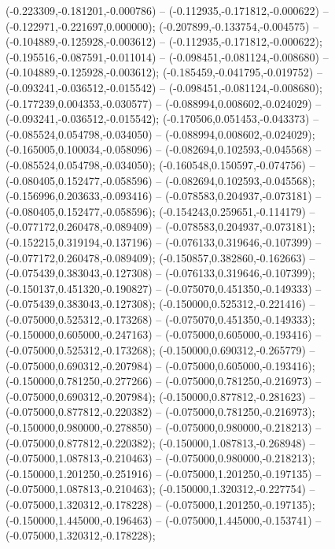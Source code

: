  (-0.223309,-0.181201,-0.000786) -- (-0.112935,-0.171812,-0.000622) -- (-0.122971,-0.221697,0.000000);
 (-0.207899,-0.133754,-0.004575) -- (-0.104889,-0.125928,-0.003612) -- (-0.112935,-0.171812,-0.000622);
 (-0.195516,-0.087591,-0.011014) -- (-0.098451,-0.081124,-0.008680) -- (-0.104889,-0.125928,-0.003612);
 (-0.185459,-0.041795,-0.019752) -- (-0.093241,-0.036512,-0.015542) -- (-0.098451,-0.081124,-0.008680);
 (-0.177239,0.004353,-0.030577) -- (-0.088994,0.008602,-0.024029) -- (-0.093241,-0.036512,-0.015542);
 (-0.170506,0.051453,-0.043373) -- (-0.085524,0.054798,-0.034050) -- (-0.088994,0.008602,-0.024029);
 (-0.165005,0.100034,-0.058096) -- (-0.082694,0.102593,-0.045568) -- (-0.085524,0.054798,-0.034050);
 (-0.160548,0.150597,-0.074756) -- (-0.080405,0.152477,-0.058596) -- (-0.082694,0.102593,-0.045568);
 (-0.156996,0.203633,-0.093416) -- (-0.078583,0.204937,-0.073181) -- (-0.080405,0.152477,-0.058596);
 (-0.154243,0.259651,-0.114179) -- (-0.077172,0.260478,-0.089409) -- (-0.078583,0.204937,-0.073181);
 (-0.152215,0.319194,-0.137196) -- (-0.076133,0.319646,-0.107399) -- (-0.077172,0.260478,-0.089409);
 (-0.150857,0.382860,-0.162663) -- (-0.075439,0.383043,-0.127308) -- (-0.076133,0.319646,-0.107399);
 (-0.150137,0.451320,-0.190827) -- (-0.075070,0.451350,-0.149333) -- (-0.075439,0.383043,-0.127308);
 (-0.150000,0.525312,-0.221416) -- (-0.075000,0.525312,-0.173268) -- (-0.075070,0.451350,-0.149333);
 (-0.150000,0.605000,-0.247163) -- (-0.075000,0.605000,-0.193416) -- (-0.075000,0.525312,-0.173268);
 (-0.150000,0.690312,-0.265779) -- (-0.075000,0.690312,-0.207984) -- (-0.075000,0.605000,-0.193416);
 (-0.150000,0.781250,-0.277266) -- (-0.075000,0.781250,-0.216973) -- (-0.075000,0.690312,-0.207984);
 (-0.150000,0.877812,-0.281623) -- (-0.075000,0.877812,-0.220382) -- (-0.075000,0.781250,-0.216973);
 (-0.150000,0.980000,-0.278850) -- (-0.075000,0.980000,-0.218213) -- (-0.075000,0.877812,-0.220382);
 (-0.150000,1.087813,-0.268948) -- (-0.075000,1.087813,-0.210463) -- (-0.075000,0.980000,-0.218213);
 (-0.150000,1.201250,-0.251916) -- (-0.075000,1.201250,-0.197135) -- (-0.075000,1.087813,-0.210463);
 (-0.150000,1.320312,-0.227754) -- (-0.075000,1.320312,-0.178228) -- (-0.075000,1.201250,-0.197135);
 (-0.150000,1.445000,-0.196463) -- (-0.075000,1.445000,-0.153741) -- (-0.075000,1.320312,-0.178228);
